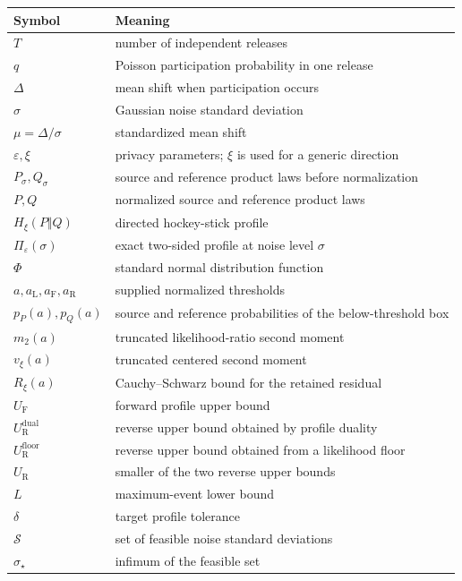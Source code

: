 \documentclass[11pt]{article}
\theoremstyle{remark}
\begin{document}
\begin{center}
\begin{tabular}{@{}ll@{}}
\toprule
Symbol & Meaning\\
\midrule
$T$ & number of independent releases\\
$q$ & Poisson participation probability in one release\\
$\Delta$ & mean shift when participation occurs\\
$\sigma$ & Gaussian noise standard deviation\\
$\mu=\Delta/\sigma$ & standardized mean shift\\
$\varepsilon,\xi$ & privacy parameters; $\xi$ is used for a generic direction\\
$P_\sigma,Q_\sigma$ & source and reference product laws before normalization\\
$P,Q$ & normalized source and reference product laws\\
$H_\xi(P\Vert Q)$ & directed hockey-stick profile\\
$\Pi_\varepsilon(\sigma)$ & exact two-sided profile at noise level $\sigma$\\
$\Phi$ & standard normal distribution function\\
$a,a_{\mathrm L},a_{\mathrm F},a_{\mathrm R}$ & supplied normalized thresholds\\
$p_P(a),p_Q(a)$ & source and reference probabilities of the below-threshold box\\
$m_2(a)$ & truncated likelihood-ratio second moment\\
$v_\xi(a)$ & truncated centered second moment\\
$R_\xi(a)$ & Cauchy--Schwarz bound for the retained residual\\
$U_{\mathrm F}$ & forward profile upper bound\\
$U_{\mathrm R}^{\mathrm{dual}}$ & reverse upper bound obtained by profile duality\\
$U_{\mathrm R}^{\mathrm{floor}}$ & reverse upper bound obtained from a likelihood floor\\
$U_{\mathrm R}$ & smaller of the two reverse upper bounds\\
$L$ & maximum-event lower bound\\
$\delta$ & target profile tolerance\\
$\mathcal S$ & set of feasible noise standard deviations\\
$\sigma_\star$ & infimum of the feasible set\\
\bottomrule
\end{tabular}
\end{center}
\end{document}
